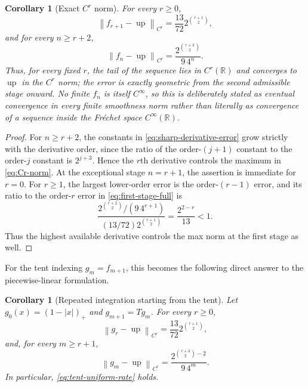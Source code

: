 \documentclass[11pt,oneside]{article}
\newtheorem{corollary}[theorem]{Corollary}
\theoremstyle{definition}
\theoremstyle{remark}
\newcommand{\R}{\mathbb R}
\newcommand{\Up}{\operatorname{up}}
\newcommand{\norm}[1]{\left\lVert#1\right\rVert}
\newcommand{\pos}[1]{\left(#1\right)_{+}}
\begin{document}
\begin{corollary}[Exact $C^r$ norm]
\label{cor:exact-Cr-rate}
For every $r\ge0$,
\begin{equation}
 \norm{f_{r+1}-\Up}_{C^r}
 =\frac{13}{72}2^{\binom{r+1}{2}},
 \label{eq:first-Cr-error}
\end{equation}
and for every $n\ge r+2$,
\begin{equation}
 \boxed{\displaystyle
 \norm{f_n-\Up}_{C^r}
 =\frac{2^{\binom{r+3}{2}}}{9\,4^n}.}
 \label{eq:exact-Cr-rate}
\end{equation}
Thus, for every fixed $r$, the tail of the sequence lies in $C^r(\R)$ and converges to
$\Up$ in the $C^r$ norm; the error is exactly geometric from the second admissible stage
onward.  No finite $f_n$ is itself $C^\infty$, so this is deliberately stated as eventual
convergence in every finite smoothness norm rather than literally as convergence of a
sequence inside the Fr\'echet space $C^\infty(\R)$.
\end{corollary}

\begin{proof}
For $n\ge r+2$, the constants in \eqref{eq:sharp-derivative-error} grow strictly with the
derivative order, since the ratio of the order-$(j+1)$ constant to the order-$j$ constant
is $2^{j+3}$.  Hence the $r$th derivative controls the maximum in
\eqref{eq:Cr-norm}.  At the exceptional stage $n=r+1$, the assertion is immediate for
$r=0$.  For $r\ge1$, the largest lower-order error is the order-$(r-1)$ error, and its
ratio to the order-$r$ error in \eqref{eq:first-stage-full} is
\[
 \frac{2^{\binom{r+2}{2}}/(9\,4^{r+1})}
 {(13/72)2^{\binom{r+1}{2}}}
 =\frac{2^{2-r}}{13}<1.
\]
Thus the highest available derivative controls the max norm at the first stage as well.
\end{proof}

For the tent indexing $g_m=f_{m+1}$, this becomes the following direct answer to the
piecewise-linear formulation.

\begin{corollary}[Repeated integration starting from the tent]
\label{cor:tent-indexed-rate}
Let $g_0(x)=\pos{1-|x|}$ and $g_{m+1}=Tg_m$.  For every $r\ge0$,
\begin{equation}
 \norm{g_r-\Up}_{C^r}
 =\frac{13}{72}2^{\binom{r+1}{2}},
 \label{eq:tent-first-Cr}
\end{equation}
and, for every $m\ge r+1$,
\begin{equation}
 \boxed{\displaystyle
 \norm{g_m-\Up}_{C^r}
 =\frac{2^{\binom{r+3}{2}-2}}{9\,4^m}.}
 \label{eq:tent-Cr-rate}
\end{equation}
In particular, \eqref{eq:tent-uniform-rate} holds.
\end{corollary}
\end{document}
